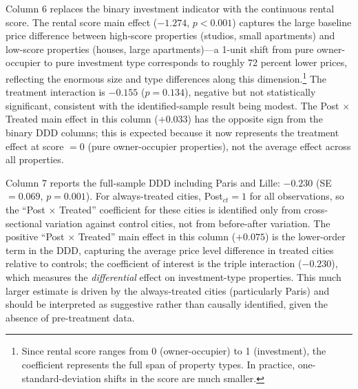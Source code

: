 \documentclass[12pt]{article}
\begin{document}
Column 6 replaces the binary investment indicator with the continuous rental score. The rental score main effect ($-1.274$, $p < 0.001$) captures the large baseline price difference between high-score properties (studios, small apartments) and low-score properties (houses, large apartments)---a 1-unit shift from pure owner-occupier to pure investment type corresponds to roughly 72 percent lower prices, reflecting the enormous size and type differences along this dimension.\footnote{Since rental score ranges from 0 (owner-occupier) to 1 (investment), the coefficient represents the full span of property types. In practice, one-standard-deviation shifts in the score are much smaller.} The treatment interaction is $-0.155$ ($p = 0.134$), negative but not statistically significant, consistent with the identified-sample result being modest. The Post $\times$ Treated main effect in this column ($+0.033$) has the opposite sign from the binary DDD columns; this is expected because it now represents the treatment effect at score $= 0$ (pure owner-occupier properties), not the average effect across all properties.

Column 7 reports the full-sample DDD including Paris and Lille: $-0.230$ (SE $= 0.069$, $p = 0.001$). For always-treated cities, Post$_{ct} = 1$ for all observations, so the ``Post $\times$ Treated'' coefficient for these cities is identified only from cross-sectional variation against control cities, not from before-after variation. The positive ``Post $\times$ Treated'' main effect in this column ($+0.075$) is the lower-order term in the DDD, capturing the average price level difference in treated cities relative to controls; the coefficient of interest is the triple interaction ($-0.230$), which measures the \emph{differential} effect on investment-type properties. This much larger estimate is driven by the always-treated cities (particularly Paris) and should be interpreted as suggestive rather than causally identified, given the absence of pre-treatment data.
\end{document}
